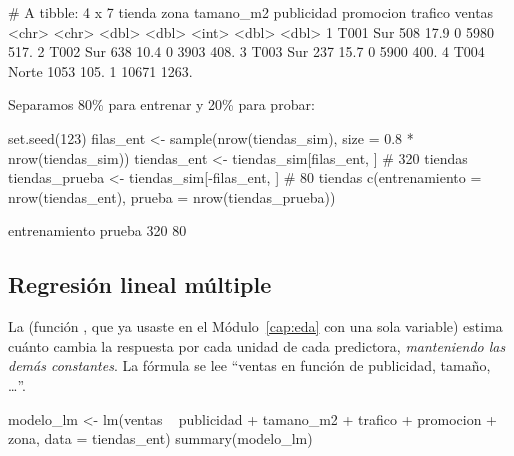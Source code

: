 \begin{rsalida}
# A tibble: 4 x 7
  tienda zona  tamano_m2 publicidad promocion trafico ventas
  <chr>  <chr>     <dbl>      <dbl>     <int>   <dbl>  <dbl>
1 T001   Sur         508       17.9         0    5980   517.
2 T002   Sur         638       10.4         0    3903   408.
3 T003   Sur         237       15.7         0    5900   400.
4 T004   Norte      1053      105.          1   10671  1263.
\end{rsalida}

Separamos 80\% para entrenar y 20\% para probar:

\begin{rcode}
set.seed(123)
filas_ent <- sample(nrow(tiendas_sim), size = 0.8 * nrow(tiendas_sim))
tiendas_ent    <- tiendas_sim[filas_ent, ]    # 320 tiendas
tiendas_prueba <- tiendas_sim[-filas_ent, ]   # 80 tiendas
c(entrenamiento = nrow(tiendas_ent), prueba = nrow(tiendas_prueba))
\end{rcode}

\begin{rsalida}
entrenamiento        prueba 
          320            80 
\end{rsalida}

\subsection{Regresión lineal múltiple}

La  (función , que ya usaste en
el Módulo~\ref{cap:eda} con una sola variable) estima cuánto cambia la
respuesta por cada unidad de cada predictora, \emph{manteniendo las demás
constantes}. La fórmula 
se lee ``ventas en función de publicidad, tamaño, \ldots''.

\begin{rcode}
modelo_lm <- lm(ventas ~ publicidad + tamano_m2 + trafico + promocion +
                  zona, data = tiendas_ent)
summary(modelo_lm)
\end{rcode}

